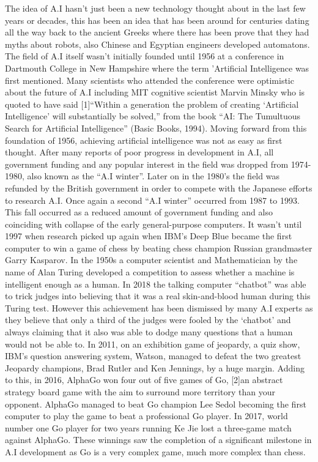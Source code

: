 \documentclass[letterpaper, 10 pt, conference]{ieeeconf}  %
\begin{document}
The idea of A.I hasn't just been a new technology thought about in the last few years or decades, this has been an idea that has been around for centuries dating all the way back to the ancient Greeks where there has been prove that they had myths about robots, also Chinese and Egyptian engineers developed automatons. The field of A.I itself wasn't initially founded until 1956 at a conference in Dartmouth College in New Hampshire where the term 'Artificial Intelligence was first mentioned. Many scientists who attended the conference were optimistic about the future of A.I including MIT cognitive scientist Marvin Minsky who is quoted to have said [1]“Within a generation the problem of creating ‘Artificial Intelligence’ will substantially be solved,” from the book “AI: The Tumultuous Search for Artificial Intelligence” (Basic Books, 1994). Moving forward from this foundation of 1956, achieving artificial intelligence was not as easy as first thought. After many reports of poor progress in development in A.I, all government funding and any popular interest in the field was dropped from 1974-1980, also known as the “A.I winter”. Later on in the 1980’s the field was refunded by the British government in order to compete with the Japanese efforts to research A.I. Once again a second “A.I winter” occurred from 1987 to 1993. This fall occurred as a reduced amount of government funding and also coinciding with collapse of the early general-purpose computers. 
It wasn’t until 1997 when research picked up again when IBM’s Deep Blue became the first computer to win a game of chess by beating chess champion Russian grandmaster Garry Kasparov. In the 1950s a computer scientist and Mathematician by the name of Alan Turing developed a competition to assess whether a machine is intelligent enough as a human. In 2018 the talking computer “chatbot” was able to trick judges into believing that it was a real skin-and-blood human during this Turing test. However this achievement has been dismissed by many A.I experts as they believe that only a third of the judges were fooled by the ‘chatbot’ and always claiming that it also was able to dodge many questions that a human would not be able to. 
In 2011, on an exhibition game of jeopardy, a quiz show, IBM’s question answering system, Watson, managed to defeat the two greatest Jeopardy champions, Brad Rutler and Ken Jennings, by a huge margin. Adding to this, in 2016, AlphaGo won four out of five games of Go, [2]an abstract strategy board game with the aim to surround more territory than your opponent. AlphaGo managed to beat Go champion Lee Sedol becoming the first computer to play the game to beat a professional Go player. In 2017, world number one Go player for two years running Ke Jie lost a three-game match against AlphaGo. These winnings saw the completion of a significant milestone in A.I development as Go is a very complex game, much more complex than chess. 
\end{document}
